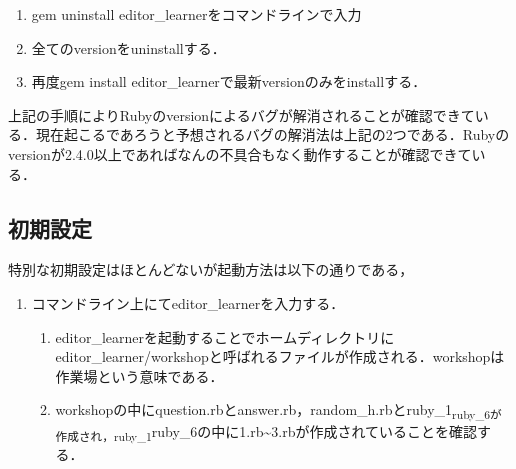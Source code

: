 \documentclass[11pt,dvipdfmx]{jsarticle}
\providecommand{\tightlist}{%
      \setlength{\itemsep}{0pt}\setlength{\parskip}{0pt}}
\begin{document}
\begin{enumerate}
\def\labelenumi{\arabic{enumi}.}
\tightlist
\item
  gem uninstall editor\_learnerをコマンドラインで入力
\item
  全てのversionをuninstallする．
\item
  再度gem install editor\_learnerで最新versionのみをinstallする．
\end{enumerate}

上記の手順によりRubyのversionによるバグが解消されることが確認できている．現在起こるであろうと予想されるバグの解消法は上記の2つである．Rubyのversionが2.4.0以上であればなんの不具合もなく動作することが確認できている．

    \subsection{初期設定}\label{ux521dux671fux8a2dux5b9a}

    特別な初期設定はほとんどないが起動方法は以下の通りである，

\begin{enumerate}
\def\labelenumi{\arabic{enumi}.}
\tightlist
\item
  コマンドライン上にてeditor\_learnerを入力する．

  \begin{enumerate}
  \def\labelenumii{\arabic{enumii}.}
  \setcounter{enumii}{1}
  \tightlist
  \item
    editor\_learnerを起動することでホームディレクトリにeditor\_learner/workshopと呼ばれるファイルが作成される．workshopは作業場という意味である．
  \item
    workshopの中にquestion.rbとanswer.rb，random\_h.rbとruby\_1\textsubscript{ruby\_6が作成され，ruby\_1}ruby\_6の中に1.rb\textasciitilde{}3.rbが作成されていることを確認する．
  \end{enumerate}
\end{enumerate}
\end{document}

